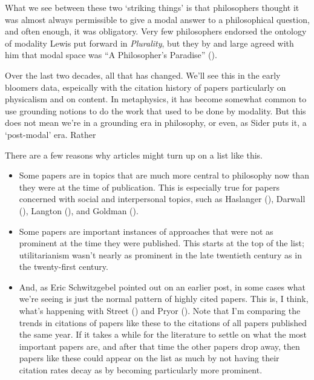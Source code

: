 \documentclass[
  10pt,
  letterpaper,
  DIV=11,
  numbers=noendperiod,
  twoside]{scrartcl}
\providecommand{\tightlist}{%
  \setlength{\itemsep}{0pt}\setlength{\parskip}{0pt}}\usepackage{longtable,booktabs,array}
\begin{document}
What we see between these two `striking things' is that philosophers
thought it was almost always permissible to give a modal answer to a
philosophical question, and often enough, it was obligatory. Very few
philosophers endorsed the ontology of modality Lewis put forward in
\emph{Plurality}, but they by and large agreed with him that modal space
was ``A Philosopher's Paradise''
().

Over the last two decades, all that has changed. We'll see this in the
early bloomers data, espeically with the citation history of papers
particularly on physicalism and on content. In metaphysics, it has
become somewhat common to use grounding notions to do the work that used
to be done by modality. But this does not mean we're in a grounding era
in philosophy, or even, as Sider puts it, a `post-modal' era. Rather

There are a few reasons why articles might turn up on a list like this.

\begin{itemize}
\tightlist
\item
  Some papers are in topics that are much more central to philosophy now
  than they were at the time of publication. This is especially true for
  papers concerned with social and interpersonal topics, such as
  Haslanger (), Darwall
  (), Langton
  (), and Goldman
  ().
\item
  Some papers are important instances of approaches that were not as
  prominent at the time they were published. This starts at the top of
  the list; utilitarianism wasn't nearly as prominent in the late
  twentieth century as in the twenty-first century.
\item
  And, as Eric Schwitzgebel pointed out on an earlier post, in some
  cases what we're seeing is just the normal pattern of highly cited
  papers. This is, I think, what's happening with Street
  () and Pryor
  (). Note that I'm comparing the
  trends in citations of papers like these to the citations of all
  papers published the same year. If it takes a while for the literature
  to settle on what the most important papers are, and after that time
  the other papers drop away, then papers like these could appear on the
  list as much by not having their citation rates decay as by becoming
  particularly more prominent.
\end{itemize}
\end{document}
